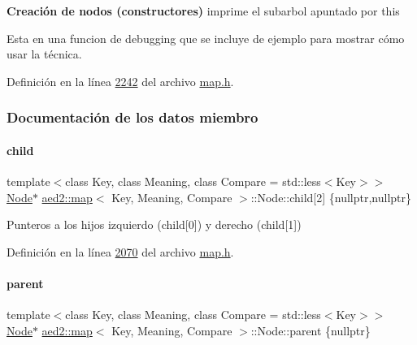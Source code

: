 \begin{Indent}{\bf \-Creación de nodos (constructores)}
imprime el subarbol apuntado por this 

Esta en una funcion de debugging que se incluye de ejemplo para mostrar cómo usar la técnica. 

Definición en la línea \hyperlink{map_8h_source_l02242}{2242} del archivo \hyperlink{map_8h_source}{map.\+h}.



\subsubsection{Documentación de los datos miembro}
\mbox{\label{structaed2_1_1map_1_1Node_a7d65c374c73c443a46d8fc224aff9e82_a7d65c374c73c443a46d8fc224aff9e82}} 
\paragraph{\texorpdfstring{child}{child}}
{\footnotesize\ttfamily template$<$class Key, class Meaning, class Compare = std\+::less$<$\+Key$>$$>$ \\
\hyperlink{structaed2_1_1map_1_1Node}{Node}$\ast$ \hyperlink{classaed2_1_1map}{aed2\+::map}$<$ Key, Meaning, Compare $>$\+::Node\+::child\mbox{[}2\mbox{]} \{nullptr,nullptr\}}



Punteros a los hijos izquierdo (child\mbox{[}0\mbox{]}) y derecho (child\mbox{[}1\mbox{]}) 



Definición en la línea \hyperlink{map_8h_source_l02070}{2070} del archivo \hyperlink{map_8h_source}{map.\+h}.

\mbox{\label{structaed2_1_1map_1_1Node_ab6a5f9e471b311755e4a56834086cb90_ab6a5f9e471b311755e4a56834086cb90}} 
\paragraph{\texorpdfstring{parent}{parent}}
{\footnotesize\ttfamily template$<$class Key, class Meaning, class Compare = std\+::less$<$\+Key$>$$>$ \\
\hyperlink{structaed2_1_1map_1_1Node}{Node}$\ast$ \hyperlink{classaed2_1_1map}{aed2\+::map}$<$ Key, Meaning, Compare $>$\+::Node\+::parent \{nullptr\}}




\end{Indent}
